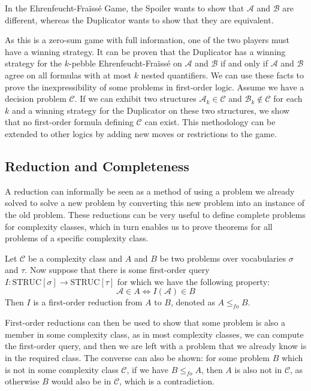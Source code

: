 In the Ehrenfeucht-Fraïssé Game, the Spoiler wants to show that $\mathcal{A}$ and $\mathcal{B}$ are different, whereas the Duplicator wants to show that they are equivalent.

As this is a zero-sum game with full information, one of the two players must have a winning strategy.
It can be proven that the Duplicator has a winning strategy for the $k$-pebble Ehrenfeucht-Fraïssé on $\mathcal{A}$ and $\mathcal{B}$ if and only if $\mathcal{A}$ and $\mathcal{B}$ agree on all formulas with at most $k$ nested quantifiers.
We can use these facts to prove the inexpressibility of some problems in first-order logic.
Assume we have a decision problem $\mathcal{C}$.
If we can exhibit two structures $\mathcal{A}_k \in \mathcal{C}$ and $\mathcal{B}_k \not \in \mathcal{C}$ for each $k$ and a winning strategy for the Duplicator on these two structures, we show that no first-order formula defining $\mathcal{C}$ can exist.
This methodology can be extended to other logics by adding new moves or restrictions to the game.


\subsection{Reduction and Completeness}\label{subsec:reduction}

A reduction can informally be seen as a method of using a problem we already solved to solve a new problem by converting this new problem into an instance of the old problem.
These reductions can be very useful to define complete problems for complexity classes, which in turn enables us to prove theorems for all problems of a specific complexity class.

\begin{define}
    Let $\mathcal{C}$ be a complexity class and $A$ and $B$ be two problems over vocabularies $\sigma$ and $\tau$.
    Now suppose that there is some first-order query $I: \text{STRUC}[\sigma] \to \text{STRUC}[\tau]$ for which we have the following property:
    \[
        \mathcal{A} \in A \Leftrightarrow I(\mathcal{A}) \in B
    \]
    Then $I$ is a first-order reduction from $A$ to $B$, denoted as $A \leq_{fo} B$.
\end{define}

First-order reductions can then be used to show that some problem is also a member in some complexity class, as in most complexity classes, we can compute the first-order query, and then we are left with a problem that we already know is in the required class.
The converse can also be shown: for some problem $B$ which is not in some complexity class $\mathcal{C}$, if we have $B \leq_{fo} A$, then $A$ is also not in $\mathcal{C}$, as otherwise $B$ would also be in $\mathcal{C}$, which is a contradiction.

